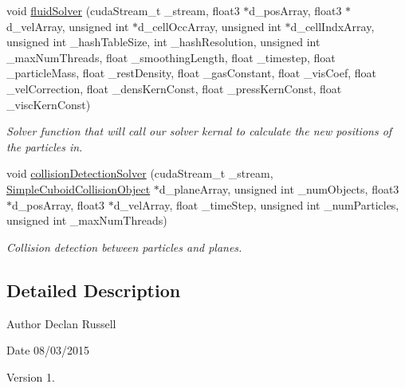 \begin{DoxyCompactItemize}
void \hyperlink{_cuda_s_p_h_kernals_8cu_a59c1e6aa2f1fb9792cde8f2ab4eba1d5}{fluid\-Solver} (cuda\-Stream\-\_\-t \-\_\-stream, float3 $\ast$d\-\_\-pos\-Array, float3 $\ast$d\-\_\-vel\-Array, unsigned int $\ast$d\-\_\-cell\-Occ\-Array, unsigned int $\ast$d\-\_\-cell\-Indx\-Array, unsigned int \-\_\-hash\-Table\-Size, int \-\_\-hash\-Resolution, unsigned int \-\_\-max\-Num\-Threads, float \-\_\-smoothing\-Length, float \-\_\-timestep, float \-\_\-particle\-Mass, float \-\_\-rest\-Density, float \-\_\-gas\-Constant, float \-\_\-vis\-Coef, float \-\_\-vel\-Correction, float \-\_\-dens\-Kern\-Const, float \-\_\-press\-Kern\-Const, float \-\_\-visc\-Kern\-Const)
\begin{DoxyCompactList}\small\item\em Solver function that will call our solver kernal to calculate the new positions of the particles in. \end{DoxyCompactList}\item 
void \hyperlink{_cuda_s_p_h_kernals_8cu_a1985239f9afd133a3db010848f3950f6}{collision\-Detection\-Solver} (cuda\-Stream\-\_\-t \-\_\-stream, \hyperlink{struct_simple_cuboid_collision_object}{Simple\-Cuboid\-Collision\-Object} $\ast$d\-\_\-plane\-Array, unsigned int \-\_\-num\-Objects, float3 $\ast$d\-\_\-pos\-Array, float3 $\ast$d\-\_\-vel\-Array, float \-\_\-time\-Step, unsigned int \-\_\-num\-Particles, unsigned int \-\_\-max\-Num\-Threads)
\begin{DoxyCompactList}\small\item\em Collision detection between particles and planes. \end{DoxyCompactList}\end{DoxyCompactItemize}


\subsection{Detailed Description}
\begin{DoxyAuthor}{Author}
Declan Russell 
\end{DoxyAuthor}
\begin{DoxyDate}{Date}
08/03/2015 
\end{DoxyDate}
\begin{DoxyVersion}{Version}
1. 
\end{DoxyVersion}


